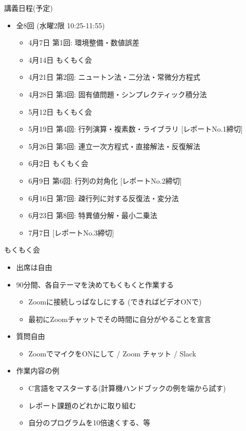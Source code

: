 \begin{frame}[t]{講義日程(予定)}
  \begin{itemize}
  \item 全8回 (水曜2限 10:25-{\color{red}11:55})
    \begin{itemize}
    \item 4月7日 第1回: 環境整備・数値誤差
    \item 4月14日 もくもく会
    \item 4月21日 第2回: ニュートン法・二分法・常微分方程式
    \item 4月28日 第3回: 固有値問題・シンプレクティック積分法
    \item 5月12日 もくもく会
    \item 5月19日 第4回: 行列演算・複素数・ライブラリ [レポートNo.1締切]
    \item 5月26日 第5回: 連立一次方程式・直接解法・反復解法
    \item 6月2日 もくもく会
    \item 6月9日 第6回: 行列の対角化 [レポートNo.2締切]
    \item 6月16日 第7回: 疎行列に対する反復法・変分法
    \item 6月23日 第8回: 特異値分解・最小二乗法
    \item 7月7日 [レポートNo.3締切]
     \end{itemize}
  \end{itemize}
\end{frame}

\begin{frame}[t]{もくもく会}
  \begin{itemize}
  \item 出席は自由
  \item 90分間、各自テーマを決めてもくもくと作業する
    \begin{itemize}
    \item Zoomに接続しっぱなしにする (できればビデオONで)
    \item 最初にZoomチャットでその時間に自分がやることを宣言
    \end{itemize}
  \item 質問自由
    \begin{itemize}
    \item ZoomでマイクをONにして / Zoom チャット / Slack
    \end{itemize}
  \item 作業内容の例
    \begin{itemize}
    \item C言語をマスターする(計算機ハンドブックの例を端から試す)
    \item レポート課題のどれかに取り組む
    \item 自分のプログラムを10倍速くする、等
    \end{itemize}
  \end{itemize}
\end{frame}
